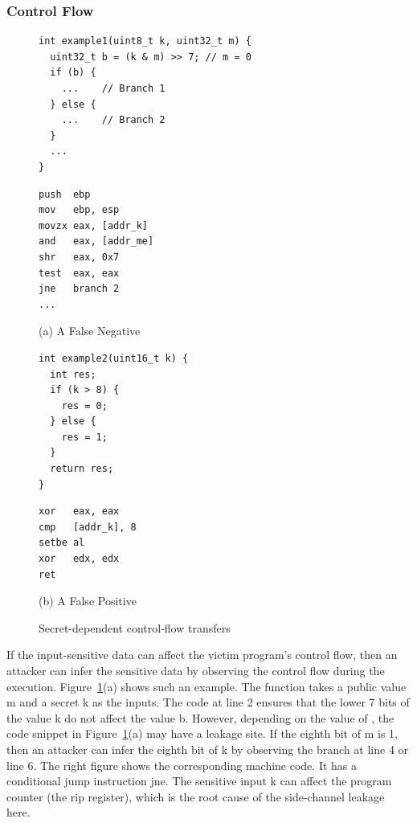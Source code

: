 \subsubsection{Control Flow}
\begin{figure}[ht]
  \begin{minipage}{0.45\linewidth}
    \begin{lstlisting}[xleftmargin=.05\textwidth, xrightmargin=.0\textwidth, frame=none]
int example1(uint8_t k, uint32_t m) { 
  uint32_t b = (k & m) >> 7; // m = 0
  if (b) {
    ...    // Branch 1
  } else {
    ...    // Branch 2
  }
  ...
}
\end{lstlisting}
  \end{minipage}
  \hfill
  \begin{minipage}{0.45\linewidth}
    \begin{lstlisting}[xleftmargin=.05\textwidth, xrightmargin=.00\textwidth, frame=none, numbers=none, mathescape=true]
push  ebp
mov   ebp, esp
movzx eax, [addr_k]    
and   eax, [addr_me] 
shr   eax, 0x7           
test  eax, eax
jne   branch 2
...
\end{lstlisting}
  \end{minipage}\caption*{(a) A False Negative}

  \begin{minipage}{0.45\linewidth}
    \begin{lstlisting}[xleftmargin=.05\textwidth, xrightmargin=.0\textwidth, frame=none]
int example2(uint16_t k) {
  int res;
  if (k > 8) {
    res = 0;
  } else {
    res = 1;
  }
  return res;
}
\end{lstlisting}
  \end{minipage}
  \hfill
  \begin{minipage}{0.45\linewidth}
    \begin{lstlisting}[xleftmargin=.05\textwidth, xrightmargin=.00\textwidth, frame=none, numbers=none, mathescape=true]
xor   eax, eax
cmp   [addr_k], 8
setbe al
xor   edx, edx
ret
\end{lstlisting}
  \end{minipage}\caption*{(b) A False Positive}
  \caption{Secret-dependent control-flow transfers}\label{fig:chapter3:cf}
\end{figure}

If the input-sensitive data can affect the victim program's control flow, then an attacker can infer the sensitive data by observing the control flow during the execution. Figure~\ref{fig:chapter3:cf}(a) shows such an example. The function takes a public value \textsf{m} and a secret \textsf{k} as the inputs. The code at line 2 ensures that the lower 7 bits of the value \textsf{k} do not affect the value \textsf{b}. However, depending on the value of , the code snippet in Figure~\ref{fig:chapter3:cf}(a) may have a leakage site. If the eighth bit of \textsf{m} is 1, then an attacker can infer the eighth bit of \textsf{k} by observing the branch at line 4 or line 6. The right figure shows the corresponding machine code. It has a conditional jump instruction \textsf{jne}. The sensitive input \textsf{k} can affect the program counter (the \textsf{rip} register), which is the root cause of the side-channel leakage here.

